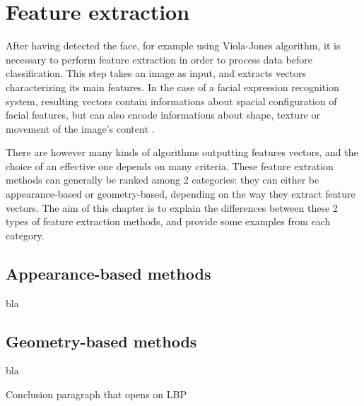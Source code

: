 \chapter{Feature extraction}
\label{chap:extraction}

\noindent After having detected the face, for example using Viola-Jones algorithm, it is necessary to perform feature extraction in order to process data before classification. 
This step takes an image as input, and extracts vectors characterizing its main features. In the case of a facial expression recognition system, resulting vectors contain informations about spacial configuration of facial features, but can also encode informations about shape, texture or movement of the image's content \cite{CHI03}.
\newline

\noindent There are however many kinds of algorithms outputting features vectors, and the choice of an effective one depends on many criteria. These feature extration methods can generally be ranked among 2 categories: they can either be appearance-based or geometry-based, depending on the way they extract feature vectors. The aim of this chapter is to explain the differences between these 2 types of feature extraction methods, and provide some examples from each category.
\newline

\section{Appearance-based methods}

\noindent bla
\newline

\section{Geometry-based methods}
\noindent bla
\newline

\noindent Conclusion paragraph that opens on LBP

